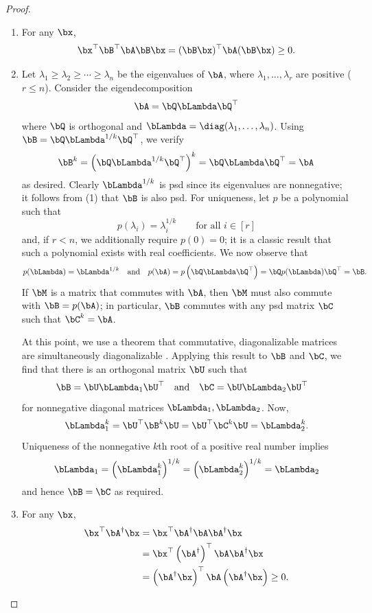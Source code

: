 \begin{proof}\,
    \begin{enumerate}
        \item For any $\bx$,
        \begin{align*}
            \bx^\top\bB^\top\bA\bB\bx = (\bB\bx)^\top\bA(\bB\bx)\geq 0.
        \end{align*}
        
        \item Let $\lambda_1 \geq \lambda_2\geq\cdots\geq\lambda_n$ be the eigenvalues of $\bA$, where $\lambda_1,\ldots, \lambda_r$ are positive ($r\leq n$). Consider the eigendecomposition
        \[\bA = \bQ\bLambda\bQ^\top\]
        where $\bQ$ is orthogonal and $\bLambda = \diag(\lambda_1, \ldots, \lambda_n)$. Using $\bB = \bQ\bLambda^{1/k}\bQ^\top$, we verify
        \[\bB^k = \left(\bQ\bLambda^{1/k}\bQ^\top\right)^k = \bQ\bLambda\bQ^\top = \bA\]
        as desired. Clearly $\bLambda^{1/k}$ is psd since its eigenvalues are nonnegative; it follows from (1) that $\bB$ is also psd. For uniqueness, let $p$ be a polynomial such that 
        $$p(\lambda_i) = \lambda_i^{1/k}\qquad \text{for all } i\in [r]$$
        and, if $r < n$, we additionally require $p(0) = 0$; it is a classic result that such a polynomial exists with real coefficients. We now observe that
        \[p(\bLambda) = \bLambda^{1/k}\quad\text{and}\quad p(\bA) = p\left(\bQ\bLambda\bQ^\top\right) = \bQ p(\bLambda)\bQ^\top = \bB.\]
        If $\bM$ is a matrix that commutes with $\bA$, then $\bM$ must also commute with $\bB = p(\bA)$; in particular, $\bB$ commutes with any psd matrix $\bC$ such that $\bC^k = \bA$.

        At this point, we use a theorem that commutative, diagonalizable matrices are simultaneously diagonalizable \cite[Theorem 4.1.6]{horn_matrix_2017}. Applying this result to $\bB$ and $\bC$, we find that there is an orthogonal matrix $\bU$ such that
        \[\bB = \bU\bLambda_1\bU^\top\quad\text{and}\quad\bC = \bU\bLambda_2\bU^\top\quad\]
        for nonnegative diagonal matrices $\bLambda_1, \bLambda_2$. Now,
        \[\bLambda_1^k = \bU^\top\bB^k\bU = \bU^\top\bC^k\bU = \bLambda_2^k.\]
        Uniqueness of the nonnegative $k$th root of a positive real number implies 
        \[\bLambda_1 = \left(\bLambda_1^k\right)^{1/k} = \left(\bLambda_2^k\right)^{1/k} = \bLambda_2\]
        and hence $\bB = \bC$ as required.
        
        \item For any $\bx$,
        \begin{align*}
            \bx^\top\bA^\dagger\bx &= \bx^\top\bA^\dagger\bA\bA^\dagger\bx\\
            &= \bx^\top\left(\bA^\dagger\right)^\top\bA\bA^\dagger\bx\\
            &=\left(\bA^\dagger\bx\right)^\top\bA\left(\bA^\dagger\bx\right)\geq 0.
        \end{align*}
    \end{enumerate}
\end{proof}


